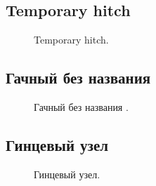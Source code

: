 
\subsection{Temporary hitch}

\begin{figure}[H]\centering
	\begin{minipage}{1\linewidth}
		\begin{center}
			\tcbox[enhanced jigsaw,colframe=black,opacityframe=0.5,opacityback=0.5]
			{\centering{}}
		\end{center}
	\end{minipage}
\caption{Temporary hitch.}
\label{ris:Temporary_hitch}
\end{figure}

\addtocounter{GachnyNoName}{1}

\subsection{Гачный без названия }

\begin{figure}[H]\centering
	\begin{minipage}{1\linewidth}
		\begin{center}
			\tcbox[enhanced jigsaw,colframe=black,opacityframe=0.5,opacityback=0.5]
			{\centering{}}
		\end{center}
	\end{minipage}
\caption{Гачный без названия .}
\label{ris:Gachny_Noname_1}
\end{figure}


\subsection{Гинцевый узел}

\begin{figure}[H]\centering
	\begin{minipage}{1\linewidth}
		\begin{center}
			\tcbox[enhanced jigsaw,colframe=black,opacityframe=0.5,opacityback=0.5]
			{\centering{}}
		\end{center}
	\end{minipage}
\caption{Гинцевый узел.}
\label{ris:Gincevy}
\end{figure}

